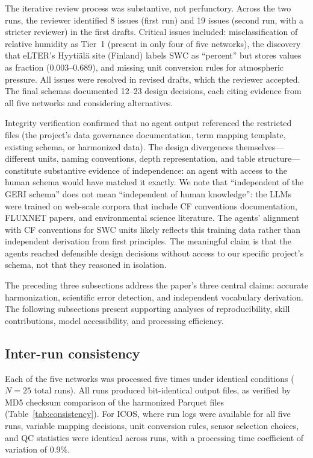 \documentclass[review,authoryear]{elsarticle}
\begin{document}
The iterative review process was substantive, not perfunctory. Across the two runs, the reviewer identified 8 issues (first run) and 19 issues (second run, with a stricter reviewer) in the first drafts. Critical issues included: misclassification of relative humidity as Tier~1 (present in only four of five networks), the discovery that eLTER's Hyyti\"{a}l\"{a} site (Finland) labels SWC as ``percent'' but stores values as fraction (0.003--0.689), and missing unit conversion rules for atmospheric pressure. All issues were resolved in revised drafts, which the reviewer accepted. The final schemas documented 12--23 design decisions, each citing evidence from all five networks and considering alternatives.

Integrity verification confirmed that no agent output referenced the restricted files (the project's data governance documentation, term mapping template, existing schema, or harmonized data). The design divergences themselves---different units, naming conventions, depth representation, and table structure---constitute substantive evidence of independence: an agent with access to the human schema would have matched it exactly. We note that ``independent of the GERI schema'' does not mean ``independent of human knowledge'': the LLMs were trained on web-scale corpora that include CF conventions documentation, FLUXNET papers, and environmental science literature. The agents' alignment with CF conventions for SWC units likely reflects this training data rather than independent derivation from first principles. The meaningful claim is that the agents reached defensible design decisions without access to our specific project's schema, not that they reasoned in isolation.

\bigskip
\noindent The preceding three subsections address the paper's three central claims: accurate harmonization, scientific error detection, and independent vocabulary derivation. The following subsections present supporting analyses of reproducibility, skill contributions, model accessibility, and processing efficiency.

\subsection{Inter-run consistency}
\label{sec:consistency}

Each of the five networks was processed five times under identical conditions ($N = 25$ total runs). All runs produced bit-identical output files, as verified by MD5 checksum comparison of the harmonized Parquet files (Table~\ref{tab:consistency}). For ICOS, where run logs were available for all five runs, variable mapping decisions, unit conversion rules, sensor selection choices, and QC statistics were identical across runs, with a processing time coefficient of variation of 0.9\%.
\end{document}
